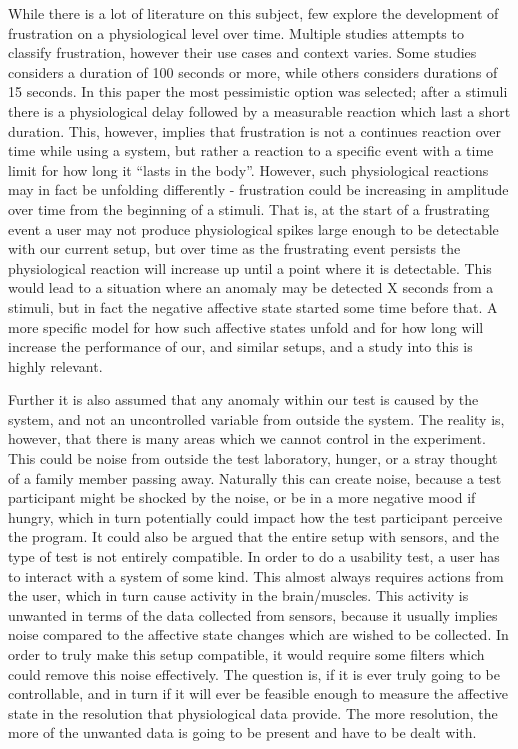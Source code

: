While there is a lot of literature on this subject, few explore the development of frustration on a physiological level
over time.  Multiple studies attempts to classify frustration, however their use cases and context varies.  Some studies
considers a duration of 100 seconds or more\cite{machine_learning_100s_gsr}, while others considers durations of 15
seconds\cite{brainwave_signals_frustration}.  In this paper the most pessimistic option was selected; after a stimuli
there is a physiological delay followed by a measurable reaction which last a short duration.  This, however, implies
that frustration is not a continues reaction over time while using a system, but rather a reaction to a specific event
with a time limit for how long it ``lasts in the body''.  However, such physiological reactions may in fact be unfolding
differently - frustration could be increasing in amplitude over time from the beginning of a stimuli.  That is, at the
start of a frustrating event a user may not produce physiological spikes large enough to be detectable with our current
setup, but over time as the frustrating event persists the physiological reaction will increase up until a point where
it is detectable.  This would lead to a situation where an anomaly may be detected X seconds from a stimuli, but in fact
the negative affective state started some time before that.  A more specific model for how such affective states unfold
and for how long will increase the performance of our, and similar setups, and a study into this is highly relevant.

Further it is also assumed that any anomaly within our test is caused by the system, and not an uncontrolled variable from outside the system. 
The reality is, however, that there is many areas which we cannot control in the experiment.
This could be noise from outside the test laboratory, hunger, or a stray thought of a family member passing away.
Naturally this can create noise, because a test participant might be shocked by the noise, or be in a more negative mood if hungry, which in turn potentially could impact how the test participant perceive the program. 
It could also be argued that the entire setup with sensors, and the type of test is not entirely compatible. 
In order to do a usability test, a user has to interact with a system of some kind. 
This almost always requires actions from the user, which in turn cause activity in the brain/muscles. 
This activity is unwanted in terms of the data collected from sensors, because it usually implies noise compared to the affective state changes which are wished to be collected. 
In order to truly make this setup compatible, it would require some filters which could remove this noise effectively.
The question is, if it is ever truly going to be controllable, and in turn if it will ever be feasible enough to measure the affective state in the resolution that physiological data provide.
The more resolution, the more of the unwanted data is going to be present and have to be dealt with.

